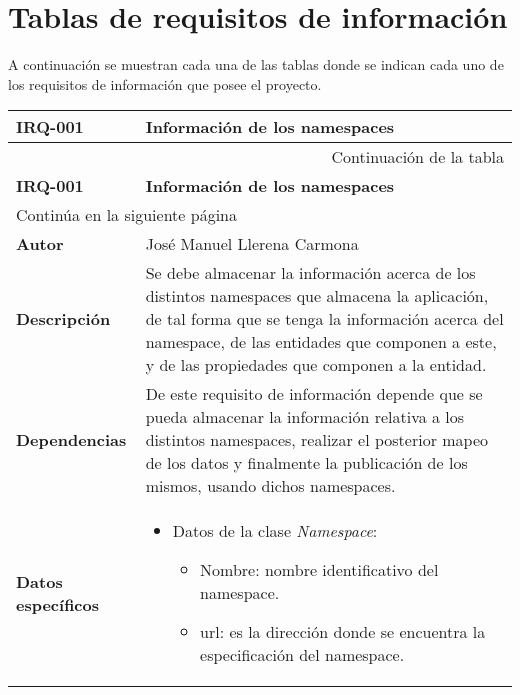 \section{Tablas de requisitos de información}

A continuación se muestran cada una de las tablas donde se indican cada uno de
los requisitos de información que posee el proyecto.

\begin{center}
\begin{longtable}{||p{3.4cm}|p{12cm}||}
 \hline \hline \bf IRQ-001 &  \bf Información de los namespaces \\
\hline
\endfirsthead
\hline \multicolumn{2}{|r|}{{Continuación de la tabla}} \\ \hline
 \hline \bf IRQ-001 &  \bf Información de los namespaces \\
\hline
\endhead
\hline \multicolumn{2}{|l|}{{Continúa en la siguiente página}} \\ \hline
\endfoot
\endlastfoot
 \hline \bf Autor & José Manuel Llerena Carmona \\
 \hline \bf Descripción & Se debe almacenar la información acerca de los
             distintos namespaces que almacena la aplicación, de tal forma que
             se tenga la información acerca del namespace, de las entidades que
             componen a este, y de las propiedades que componen a la entidad.\\
 \hline \bf Dependencias & De este requisito de información depende que se
                            pueda almacenar la información relativa a los
                            distintos namespaces, realizar el posterior mapeo de
                            los datos y finalmente la publicación de los mismos,
                            usando dichos namespaces.\\
 \hline \bf Datos específicos &
             \begin{itemize} 
                 \item Datos de la clase \textit{Namespace}:
                 \begin{itemize}
                    \item Nombre: nombre identificativo del namespace.
                    \item url: es la dirección donde se encuentra la
                                especificación del namespace.

\end{itemize}
\end{itemize}
\end{longtable}
\end{center}
